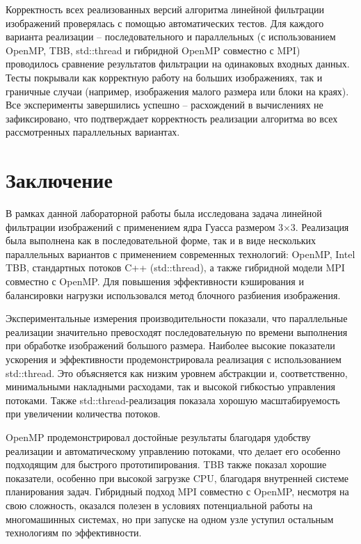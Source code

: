 \documentclass[14pt, a4paper]{extarticle}
\begin{document}
Корректность всех реализованных версий алгоритма линейной фильтрации изображений проверялась с помощью автоматических тестов. Для каждого варианта реализации – последовательного и параллельных (с использованием OpenMP, TBB, std::thread и гибридной OpenMP совместно с MPI) проводилось сравнение результатов фильтрации на одинаковых входных данных. Тесты покрывали как корректную работу на больших изображениях, так и граничные случаи (например, изображения малого размера или блоки на краях).
Все эксперименты завершились успешно – расхождений в вычислениях не зафиксировано, что подтверждает корректность реализации алгоритма во всех рассмотренных параллельных вариантах.


\newpage

\section*{Заключение}
В рамках данной лабораторной работы была исследована задача линейной фильтрации изображений с применением ядра Гуасса размером 3×3. Реализация была выполнена как в последовательной форме, так и в виде нескольких параллельных вариантов с применением современных технологий: OpenMP, Intel TBB, стандартных потоков C++ (std::thread), а также гибридной модели MPI совместно с OpenMP. Для повышения эффективности кэширования и балансировки нагрузки использовался метод блочного разбиения изображения.

Экспериментальные измерения производительности показали, что параллельные реализации значительно превосходят последовательную по времени выполнения при обработке изображений большого размера. Наиболее высокие показатели ускорения и эффективности продемонстрировала реализация с использованием std::thread. Это объясняется как низким уровнем абстракции и, соответственно, минимальными накладными расходами, так и высокой гибкостью управления потоками. Также std::thread-реализация показала хорошую масштабируемость при увеличении количества потоков.

OpenMP продемонстрировал достойные результаты благодаря удобству реализации и автоматическому управлению потоками, что делает его особенно подходящим для быстрого прототипирования. TBB также показал хорошие показатели, особенно при высокой загрузке CPU, благодаря внутренней системе планирования задач. Гибридный подход MPI совместно с OpenMP, несмотря на свою сложность, оказался полезен в условиях потенциальной работы на многомашинных системах, но при запуске на одном узле уступил остальным технологиям по эффективности.
\end{document}
